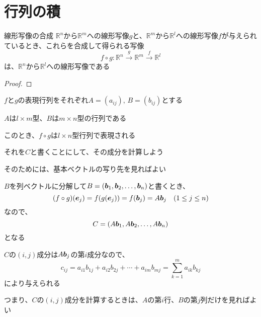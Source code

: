 \documentclass[../../../topic_linear-map]{subfiles}
\begin{document}
\sectionline
\section{行列の積}

\begin{theorem}{線形写像の合成}
  $\mathbb{R}^n$から$\mathbb{R}^m$への線形写像$g$と、$\mathbb{R}^m$から$\mathbb{R}^l$への線形写像$f$が与えられているとき、これらを合成して得られる写像
  \begin{equation*}
    f \circ g\colon \mathbb{R}^n \xrightarrow{g} \mathbb{R}^m \xrightarrow{f} \mathbb{R}^l
  \end{equation*}
  は、$\mathbb{R}^n$から$\mathbb{R}^l$への線形写像である
\end{theorem}

\begin{proof}
\end{proof}

$f$と$g$の表現行列をそれぞれ$A = (a_{ij}), \, B = (b_{ij})$とする

$A$は$l \times m$型、$B$は$m \times n$型の行列である

\br

このとき、$f \circ g$は$l \times n$型行列で表現される

それを$C$と書くことにして、その成分を計算しよう

そのためには、基本ベクトルの写り先を見ればよい

\br

$B$を列ベクトルに分解して$B = (\vb*{b}_1, \vb*{b}_2, \dots, \vb*{b}_n)$と書くとき、
\begin{equation*}
  (f \circ g)(\vb*{e}_j) = f(g(\vb*{e}_j)) = f(\vb*{b}_j) = A \vb*{b}_j \quad (1 \leq j \leq n)
\end{equation*}
なので、
\begin{equation*}
  C = (A\vb*{b}_1, A\vb*{b}_2, \dots, A\vb*{b}_n)
\end{equation*}
となる

$C$の$(i, j)$成分は$A\vb*{b}_j$の第$i$成分なので、
\begin{equation*}
  c_{ij} = a_{i1} b_{1j} + a_{i2} b_{2j} + \cdots + a_{im} b_{mj} = \sum_{k=1}^m a_{ik} b_{kj}
\end{equation*}
により与えられる

つまり、$C$の$(i, j)$成分を計算するときは、$A$の第$i$行、$B$の第$j$列だけを見ればよい
\end{document}
